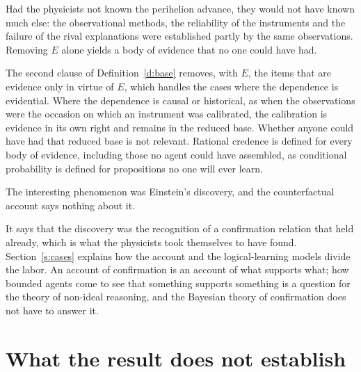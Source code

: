 \documentclass{situationist-preprint}
\begin{document}
\begin{objection}[Entanglement]
Had the physicists not known the perihelion advance, they would not have known much else: the observational methods, the reliability of the instruments and the failure of the rival explanations were established partly by the same observations. Removing $E$ alone yields a body of evidence that no one could have had.
\end{objection}

\begin{reply}
The second clause of Definition~\ref{d:base} removes, with $E$, the items that are evidence only in virtue of $E$, which handles the cases where the dependence is evidential. Where the dependence is causal or historical, as when the observations were the occasion on which an instrument was calibrated, the calibration is evidence in its own right and remains in the reduced base. Whether anyone could have had that reduced base is not relevant. Rational credence is defined for every body of evidence, including those no agent could have assembled, as conditional probability is defined for propositions no one will ever learn.
\end{reply}

\begin{objection}
The interesting phenomenon was Einstein's discovery, and the counterfactual account says nothing about it.
\end{objection}

\begin{reply}
It says that the discovery was the recognition of a confirmation relation that held already, which is what the physicists took themselves to have found. Section~\ref{s:cases} explains how the account and the logical-learning models divide the labor. An account of confirmation is an account of what supports what; how bounded agents come to see that something supports something is a question for the theory of non-ideal reasoning, and the Bayesian theory of confirmation does not have to answer it.
\end{reply}

\section{What the result does not establish}\label{s:limits}
\end{document}
